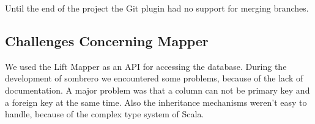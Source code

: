     Until the end of the project the Git plugin had no support for merging branches.
\subsection{Challenges Concerning Mapper}
    We used the Lift Mapper as an API for accessing the database. During the development of sombrero we encountered some problems, because of the lack of documentation. A major problem was that a column can not be primary key and a foreign key at the same time. Also the inheritance mechanisms weren't easy to handle, because of the complex type system of Scala.